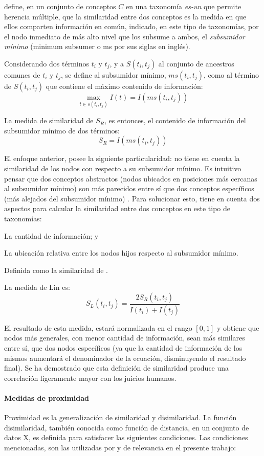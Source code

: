 \bigskip \cite{resnik1995using} define, en un conjunto de conceptos \(C\) en una taxonomía \textit{es-un} que permite herencia múltiple, que la similaridad entre dos conceptos es la medida en que ellos comparten información en común, indicado, en este tipo de taxonomías, por el nodo inmediato de más alto nivel que los subsume a ambos, el \textit{subsumidor mínimo} (minimum subsumer o ms por sus siglas en inglés).

\bigskip Considerando dos términos \(t_i\) y \(t_j\), y a \(S(t_i, t_j)\) al conjunto de ancestros comunes de \(t_i\) y \(t_j\), se define al subsumidor mínimo, \(ms(t_i, t_j)\), como al término de \(S(t_i, t_j)\) que contiene el máximo contenido de información:
\[\max_{t \in s(t_i,t_j)} I(t) = I(ms(t_i,t_j))\]

La medida de similaridad de \cite{resnik1995using} \(S_R\), es entonces, el contenido de información del subsumidor mínimo de dos términos:
\[S_R = I(ms(t_i,t_j))\]

El enfoque anterior, posee la siguiente particularidad: no tiene en cuenta la similaridad de los nodos con respecto a su subsumidor mínimo. Es intuitivo pensar que dos conceptos abstractos (nodos ubicados en posiciones más cercanas al subsumidor mínimo) son más parecidos entre sí que dos conceptos específicos (más alejados del subsumidor mínimo) \citep{lin1998information}. Para solucionar esto, \cite{lin1998information} tiene en cuenta dos aspectos para calcular la similaridad entre dos conceptos en este tipo de taxonomías: \begin{enumerate*} [label=(\roman*)] \item La cantidad de información; y \item La ubicación relativa entre los nodos hijos respecto al subsumidor mínimo.\end{enumerate*} Definida como la similaridad de \cite{resnik1995using}.

\bigskip La medida de Lin es:
\[S_L(t_i, t_j)=\frac{2S_R(t_i,t_j)}{I(t_i)+I(t_j)}\]

El resultado de esta medida, estará normalizada en el rango \([0, 1]\) y obtiene que nodos más generales, con menor cantidad de información, sean más similares entre sí, que dos nodos específicos (ya que la cantidad de información de los mismos aumentará el denominador de la ecuación, disminuyendo el resultado final). Se ha demostrado que esta definición de similaridad produce una correlación ligeramente mayor con los juicios humanos.

\paragraph{Medidas de proximidad}
Proximidad es la generalización de similaridad y disimilaridad. La función disimilaridad, también conocida como función de distancia, en un conjunto de datos X, es definida para satisfacer las siguientes condiciones. Las condiciones mencionadas, son las utilizadas por \cite{xu2008clustering} y de relevancia en el presente trabajo:

